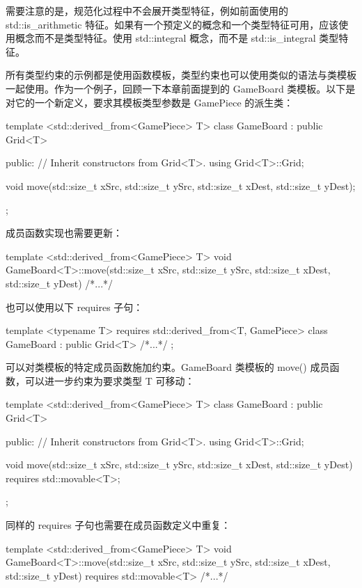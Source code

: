 需要注意的是，规范化过程中不会展开类型特征，例如前面使用的 std::is\_arithmetic 特征。如果有一个预定义的概念和一个类型特征可用，应该使用概念而不是类型特征。使用 std::integral 概念，而不是 std::is\_integral 类型特征。


所有类型约束的示例都是使用函数模板，类型约束也可以使用类似的语法与类模板一起使用。作为一个例子，回顾一下本章前面提到的 GameBoard 类模板。以下是对它的一个新定义，要求其模板类型参数是 GamePiece 的派生类：

\begin{cpp}
template <std::derived_from<GamePiece> T>
class GameBoard : public Grid<T>
{
    public:
        // Inherit constructors from Grid<T>.
        using Grid<T>::Grid;

        void move(std::size_t xSrc, std::size_t ySrc,
            std::size_t xDest, std::size_t yDest);
};
\end{cpp}

成员函数实现也需要更新：

\begin{cpp}
template <std::derived_from<GamePiece> T>
void GameBoard<T>::move(std::size_t xSrc, std::size_t ySrc,
    std::size_t xDest, std::size_t yDest) { /*...*/ }
\end{cpp}

也可以使用以下 requires 子句：

\begin{cpp}
template <typename T> requires std::derived_from<T, GamePiece>
class GameBoard : public Grid<T> { /*...*/ };
\end{cpp}


可以对类模板的特定成员函数施加约束。GameBoard 类模板的 move() 成员函数，可以进一步约束为要求类型 T 可移动：

\begin{cpp}
template <std::derived_from<GamePiece> T>
class GameBoard : public Grid<T>
{
    public:
        // Inherit constructors from Grid<T>.
        using Grid<T>::Grid;

        void move(std::size_t xSrc, std::size_t ySrc,
            std::size_t xDest, std::size_t yDest) requires std::movable<T>;
};
\end{cpp}

同样的 requires 子句也需要在成员函数定义中重复：

\begin{cpp}
template <std::derived_from<GamePiece> T>
void GameBoard<T>::move(std::size_t xSrc, std::size_t ySrc,
    std::size_t xDest, std::size_t yDest) requires std::movable<T>
{ /*...*/ }
\end{cpp}

